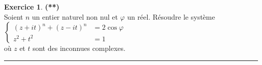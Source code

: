 \documentclass[a4paper,11pt]{article}
\theoremstyle{definition}
\newtheorem{exo}{Exercice} %
\begin{document}
		
		\begin{exo}\textbf{(**)}\quad\\[-0.8cm]
			
			Soient $n$ un entier naturel non nul et $\varphi$ un réel. Résoudre
			le système \\[-0.2cm]
			
			$\left\{\begin{aligned}
			(z + i t)^n + (z-i t)^n & = 2 \cos \varphi \\
			z^2 + t^2 & = 1
			\end{aligned}\right.$\\[0.5cm]
			où $z$ et $t$ sont des inconnues complexes.
			
			
			\centering
			\rule{1\linewidth}{0.6pt}
		\end{exo}
		
		
	
\end{document}

